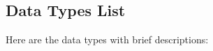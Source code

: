 \subsection{Data Types List}
Here are the data types with brief descriptions\+:\begin{DoxyCompactList}
\item{}
\end{DoxyCompactList}
